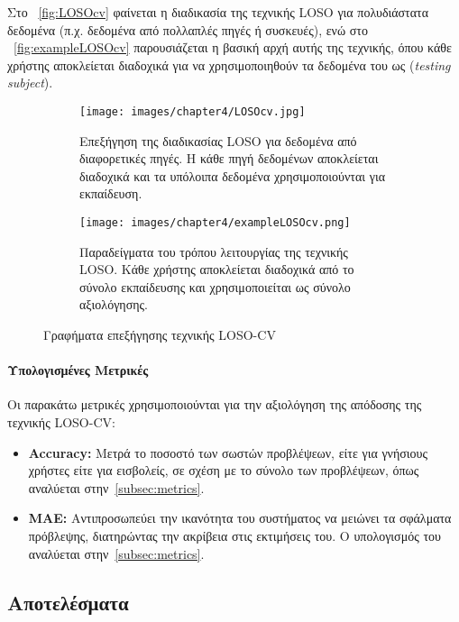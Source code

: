 Στο ~\autoref{fig:LOSOcv} φαίνεται η διαδικασία της τεχνικής LOSO για πολυδιάστατα δεδομένα (π.χ. δεδομένα από πολλαπλές πηγές ή συσκευές), ενώ στο ~\autoref{fig:exampleLOSOcv} παρουσιάζεται η βασική αρχή αυτής της τεχνικής, όπου κάθε χρήστης αποκλείεται διαδοχικά για να χρησιμοποιηθούν τα δεδομένα του ως (\emph{testing subject}).

\begin{figure}[H]
    \centering
    \begin{subfigure}{0.45\textwidth}
        \centering
        \texttt{[image: images/chapter4/LOSOcv.jpg]}
        \caption{Επεξήγηση της διαδικασίας LOSO για δεδομένα από διαφορετικές πηγές. Η κάθε πηγή δεδομένων αποκλείεται διαδοχικά και τα υπόλοιπα δεδομένα χρησιμοποιούνται για εκπαίδευση.}
        \label{fig:LOSOcv}
    \end{subfigure}
    \hfill
    \begin{subfigure}{0.45\textwidth}
        \centering
        \texttt{[image: images/chapter4/exampleLOSOcv.png]}
        \caption{Παραδείγματα του τρόπου λειτουργίας της τεχνικής LOSO. Κάθε χρήστης αποκλείεται διαδοχικά από το σύνολο εκπαίδευσης και χρησιμοποιείται ως σύνολο αξιολόγησης.}
        \label{fig:exampleLOSOcv}
    \end{subfigure}
    \caption{Γραφήματα επεξήγησης τεχνικής LOSO-CV}
    \label{fig:subgraphs}
\end{figure}

\paragraph{Υπολογισμένες Μετρικές}
Οι παρακάτω μετρικές χρησιμοποιούνται για την αξιολόγηση της απόδοσης της τεχνικής LOSO-CV:
\begin{itemize}
    \item \textbf{Accuracy:}
    Μετρά το ποσοστό των σωστών προβλέψεων, είτε για γνήσιους χρήστες είτε για εισβολείς, σε σχέση με το σύνολο των προβλέψεων, όπως αναλύεται στην~\autoref{subsec:metrics}.

    \item \textbf{MAE:}
    Αντιπροσωπεύει την ικανότητα του συστήματος να μειώνει τα σφάλματα πρόβλεψης, διατηρώντας την ακρίβεια στις εκτιμήσεις του. Ο υπολογισμός του αναλύεται στην~\autoref{subsec:metrics}.  
\end{itemize}

\subsection{Αποτελέσματα}
\label{sec:results_phase5}

